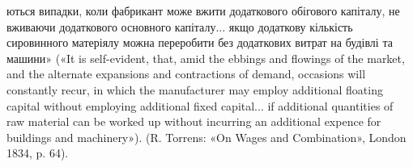 ються випадки, коли фабрикант може вжити додаткового обігового капіталу,
не вживаючи додаткового основного капіталу... якщо додаткову
кількість сировинного матеріялу можна переробити без додаткових витрат
на будівлі та машини» («It is self-evident, that, amid the ebbings and
flowings of the market, and the alternate expansions and contractions of
demand, occasions will constantly recur, in which the manufacturer may
employ additional floating capital without employing additional fixed
capital... if additional quantities of raw material can be worked up without
incurring an additional expence for buildings and machinery»).
(R. Torrens: «On Wages and Combination», London 1834, p. 64).